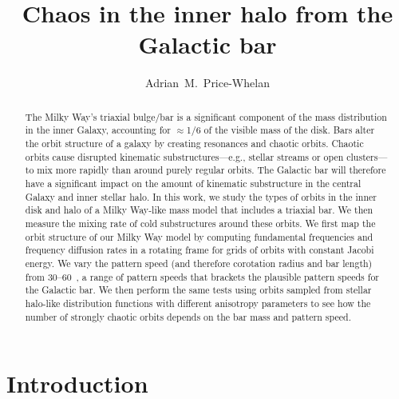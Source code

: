 \documentclass[modern]{aastex61}
\begin{document}
\sloppy\sloppypar\raggedbottom\frenchspacing %

\title{Chaos in the inner halo from the Galactic bar}

\author[0000-0003-0872-7098]{Adrian~M.~Price-Whelan}



\begin{abstract}
The Milky Way's triaxial bulge/bar is a significant component of the mass
distribution in the inner Galaxy, accounting for $\approx$1/6 of the visible
mass of the disk.
Bars alter the orbit structure of a galaxy by creating resonances and chaotic
orbits.
Chaotic orbits cause disrupted kinematic substructures---e.g., stellar streams
or open clusters---to mix more rapidly than around purely regular orbits.
The Galactic bar will therefore have a significant impact on the amount of
kinematic substructure in the central Galaxy and inner stellar halo.
In this work, we study the types of orbits in the inner disk and halo of a Milky
Way-like mass model that includes a triaxial bar.
We then measure the mixing rate of cold substructures around these orbits.
We first map the orbit structure of our Milky Way model by computing fundamental
frequencies and frequency diffusion rates in a rotating frame for grids of
orbits with constant Jacobi energy.
We vary the pattern speed (and therefore corotation radius and bar length)
from 30--60~\kmskpc, a range of pattern speeds that brackets the plausible
pattern speeds for the Galactic bar.
We then perform the same tests using orbits sampled from stellar halo-like
distribution functions with different anisotropy parameters to see how the
number of strongly chaotic orbits depends on the bar mass and pattern speed.
\end{abstract}


\section{Introduction} \label{sec:intro}
\end{document}
